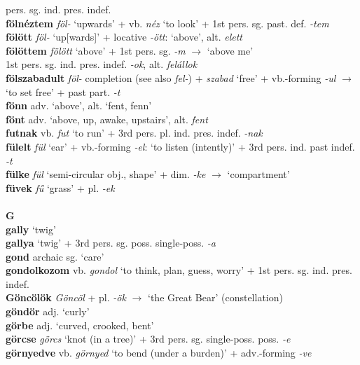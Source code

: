 \documentclass[11pt]{article}
\begin{document}
pers. sg. ind. pres. indef. \\
\textbf{fölnéztem} \emph{föl-} `upwards' + vb.
  \emph{néz} `to look' + 1st pers. sg. past. def. \emph{-tem} \\
\textbf{fölött} \emph{föl-} `up[wards]' +  locative \emph{-ött}:
`above', alt. \emph{elett} \\
\textbf{fölöttem} \emph{fölött} `above' + 1st pers. sg. \emph{-m}
$\rightarrow$ `above me' \\
1st pers. sg. ind. pres. indef. \emph{-ok}, alt. \emph{felállok} \\
\textbf{fölszabadult} \emph{föl-} completion (see
also \emph{fel-}) + \emph{szabad} `free' + vb.-forming \emph{-ul}
    $\rightarrow$ `to set free' + past part. \emph{-t} \\
\textbf{fönn} adv. `above', alt. `fent, fenn' \\
\textbf{fönt} adv. `above, up, awake, upstairs', alt. \emph{fent} \\
\textbf{futnak} vb. \emph{fut} `to run' + 3rd
pers. pl. ind. pres. indef. \emph{-nak} \\
\textbf{fülelt} \emph{fül} `ear' + vb.-forming \emph{-el}: `to listen
(intently)' + 3rd pers. ind. past indef. \emph{-t} \\
\textbf{fülke} \emph{fül} `semi\hyp{}circular obj., shape' +
dim. \emph{-ke} $\rightarrow$ `compartment' \\
\textbf{füvek} \emph{fű} `grass' + pl. \emph{-ek} \\
\ \\
\noindent \textbf{\large G} \\
\textbf{gally} `twig' \\
\textbf{gallya} `twig' + 3rd pers. sg. poss. single\hyp{}poss. \emph{-a} \\
\textbf{gond} archaic sg. `care' \\
\textbf{gondolkozom} vb. \emph{gondol} `to think, plan, guess, worry'
+ 1st pers. sg. ind. pres. indef. \\
\textbf{Göncölök} \emph{Göncöl} + pl. \emph{-ök} $\rightarrow$ `the Great Bear'
  (constellation) \\
\textbf{göndör} adj. `curly' \\
\textbf{görbe} adj. `curved, crooked, bent' \\
\textbf{görcse} \emph{görcs} `knot (in a tree)' + 3rd
pers. sg. single\hyp{}poss. poss. \emph{-e} \\
\textbf{görnyedve} vb. \emph{görnyed} `to bend (under a burden)' +
adv.\hyp{}forming \emph{-ve} \\
\end{document}
